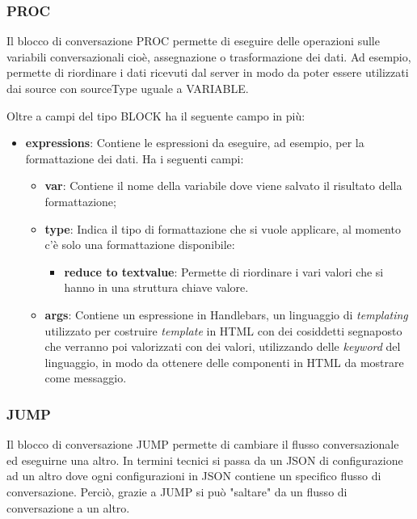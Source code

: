 \subsubsection{PROC}
Il blocco di conversazione PROC permette di eseguire delle operazioni sulle variabili conversazionali cioè, assegnazione o trasformazione dei dati. Ad esempio, permette di riordinare i dati ricevuti dal server in modo da poter essere utilizzati dai source con sourceType uguale a VARIABLE.


Oltre a campi del tipo BLOCK ha il seguente campo in più:

\begin{itemize}
	\item \textbf{expressions}: Contiene le espressioni da eseguire, ad esempio, per la formattazione dei dati.
	Ha i seguenti campi:
	\begin{itemize}
		\item \textbf{var}: Contiene il nome della variabile dove viene salvato il risultato della formattazione;
		\item \textbf{type}: Indica il tipo di formattazione che si vuole applicare, al momento c'è solo una formattazione disponibile:
		\begin{itemize}
			\item \textbf{reduce to textvalue}: Permette di riordinare i vari valori che si hanno in una struttura chiave valore.
		\end{itemize}
		\item \textbf{args}: Contiene un espressione in Handlebars, un linguaggio di \emph{templating} utilizzato per costruire \emph{template} in HTML con dei cosiddetti segnaposto che verranno poi valorizzati con dei valori, utilizzando delle \emph{keyword} del linguaggio, in modo da ottenere delle componenti in HTML da mostrare come messaggio.
	\end{itemize}
\end{itemize}

\subsubsection{JUMP}

Il blocco di conversazione JUMP permette di cambiare il flusso conversazionale ed eseguirne una altro. In termini tecnici si passa da un JSON di configurazione ad un altro dove ogni configurazioni in JSON contiene un specifico flusso di conversazione. Perciò, grazie a JUMP si può "saltare" da un flusso di conversazione a un altro.

